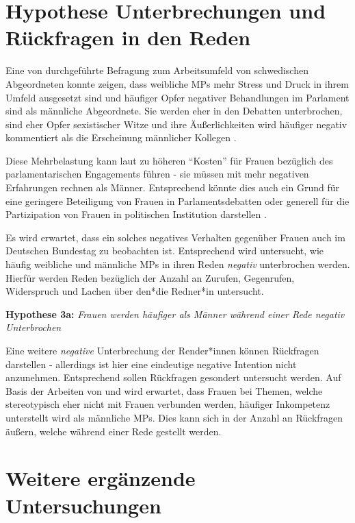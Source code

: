 \documentclass[12pt, 
    twoside=false, 
    bibliography=totoc, 
    numbers=endperiod, 
    headings=normal, 
    toc=chapterentrydotfill
    ]{scrbook}
\begin{document}
\section{Hypothese Unterbrechungen und Rückfragen in den Reden}\label{kapitel:hypothese3}

Eine von \textcite{erikson_2018} durchgeführte Befragung zum Arbeitsumfeld von schwedischen Abgeordneten konnte zeigen, dass weibliche MPs mehr Stress und Druck in ihrem Umfeld ausgesetzt sind und häufiger Opfer negativer Behandlungen im Parlament sind als männliche Abgeordnete. Sie werden eher in den Debatten unterbrochen, sind eher Opfer sexistischer Witze und ihre Äußerlichkeiten wird häufiger negativ kommentiert als die Erscheinung männlicher Kollegen \parencite[13]{erikson_2018}.

Diese Mehrbelastung kann laut \textcite{erikson_2018} zu höheren \enquote{Kosten} für Frauen bezüglich des parlamentarischen Engagements führen - sie müssen mit mehr negativen Erfahrungen rechnen als Männer. Entsprechend könnte dies auch ein Grund für eine geringere Beteiligung von Frauen in Parlamentsdebatten oder generell für die Partizipation von Frauen in politischen Institution darstellen \parencites[vgl.][]{erikson_2018}[vgl.][]{back_2014}.

Es wird erwartet, dass ein solches negatives Verhalten gegenüber Frauen auch im Deutschen Bundestag zu beobachten ist. Entsprechend wird untersucht, wie häufig weibliche und männliche MPs in ihren Reden \emph{negativ} unterbrochen werden. Hierfür werden Reden bezüglich der Anzahl an Zurufen, Gegenrufen, Widerspruch und Lachen über den*die Redner*in untersucht.

\textbf{Hypothese 3a:} \emph{Frauen werden häufiger als Männer während einer Rede negativ Unterbrochen}

Eine weitere \emph{negative} Unterbrechung der Render*innen können Rückfragen darstellen - allerdings ist hier eine eindeutige negative Intention nicht anzunehmen. Entsprechend sollen Rückfragen gesondert untersucht werden. Auf Basis der Arbeiten von \textcite{brescoll_2011} und \textcite{eagly_2002} wird erwartet, dass Frauen bei Themen, welche stereotypisch eher nicht mit Frauen verbunden werden, häufiger Inkompetenz unterstellt wird als männliche MPs. Dies kann sich in der Anzahl an Rückfragen äußern, welche während einer Rede gestellt werden. 

\section{Weitere ergänzende Untersuchungen}
\end{document}
